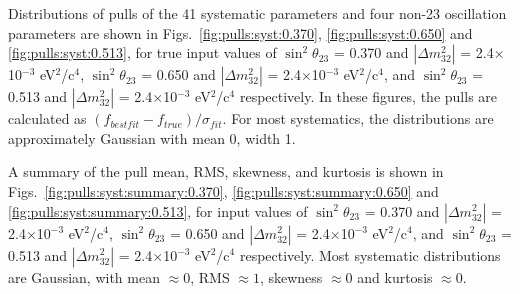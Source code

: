 

Distributions of pulls of the 41 systematic parameters and four non-23 oscillation parameters are shown in Figs.\
\ref{fig:pulls:syst:0.370}, \ref{fig:pulls:syst:0.650} and \ref{fig:pulls:syst:0.513},
for true input values of 
$\sin^{2}\theta_{23}$ = 0.370 and $|\Delta m^{2}_{32}|$ = 2.4$\times$10$^{-3}$ eV$^{2}$/c$^{4}$,
$\sin^{2}\theta_{23}$ = 0.650 and $|\Delta m^{2}_{32}|$ = 2.4$\times$10$^{-3}$ eV$^{2}$/c$^{4}$, and
$\sin^{2}\theta_{23}$ = 0.513 and $|\Delta m^{2}_{32}|$ = 2.4$\times$10$^{-3}$ eV$^{2}$/c$^{4}$ respectively.
In these figures, the pulls are calculated as $(f_{bestfit} - f_{true}) / \sigma_{fit}$. 
For most systematics, the distributions are approximately Gaussian with
mean 0, width 1.

A summary of the pull mean, RMS, skewness, and kurtosis
is shown in Figs.\
\ref{fig:pulls:syst:summary:0.370}, \ref{fig:pulls:syst:summary:0.650} and \ref{fig:pulls:syst:summary:0.513},
for input values of 
$\sin^{2}\theta_{23}$ = 0.370 and $|\Delta m^{2}_{32}|$ = 2.4$\times$10$^{-3}$ eV$^{2}$/c$^{4}$,
$\sin^{2}\theta_{23}$ = 0.650 and $|\Delta m^{2}_{32}|$ = 2.4$\times$10$^{-3}$ eV$^{2}$/c$^{4}$, and
$\sin^{2}\theta_{23}$ = 0.513 and $|\Delta m^{2}_{32}|$ = 2.4$\times$10$^{-3}$ eV$^{2}$/c$^{4}$ respectively.
Most systematic distributions are Gaussian, with mean $\approx0$, RMS $\approx1$, skewness $\approx0$ and kurtosis $\approx0$.

